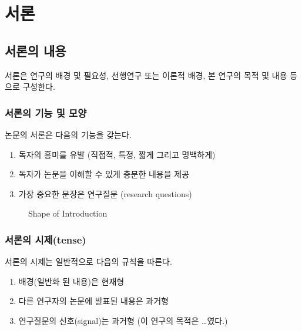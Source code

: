   \chapter{서\quad 론}
  \section{서론의 내용}
  서론은 연구의 배경 및 필요성, 선행연구 또는 이론적 배경, 본 연구의 목적 및 내용 등으로 구성한다.

  \subsection{서론의 기능 및 모양}
  논문의 서론은 다음의 기능을 갖는다.
  \begin{enumerate}
    \item 독자의 흥미를 유발 (직접적, 특정, 짧게 그리고 명백하게)
    \item 독자가 논문을 이해할 수 있게 충분한 내용을 제공
    \item 가장 중요한 문장은 연구질문 (research questions)
  \end{enumerate}

  \begin{figure}[htbp]
      \centering
      \vspace{2cm} %
      \caption{Shape of Introduction}
      \label{fig:intro_shape}
  \end{figure}

  \subsection{서론의 시제(tense)}
  서론의 시제는 일반적으로 다음의 규칙을 따른다.
  \begin{enumerate}
    \item 배경(일반화 된 내용)은 현재형
    \item 다른 연구자의 논문에 발표된 내용은 과거형
    \item 연구질문의 신호(signal)는 과거형 (이 연구의 목적은 \ldots 였다.)
  \end{enumerate}